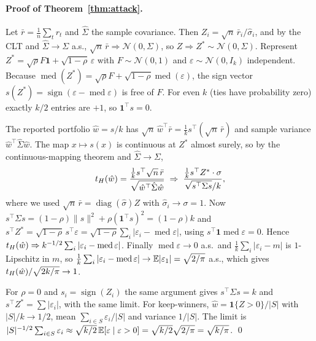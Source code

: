 \paragraph{Proof of Theorem~\ref{thm:attack}.}
Let $\bar r=\frac1n\sum_t r_t$ and $\hat\Sigma$ the sample covariance. Then $Z_i=\sqrt n\,\bar r_i/\hat\sigma_i$, and by the CLT and $\hat\Sigma\to\Sigma$ a.s., $\sqrt n\,\bar r\Rightarrow\mathcal N(0,\Sigma)$, so $Z\Rightarrow Z^\ast\sim\mathcal N(0,\Sigma)$. Represent $Z^\ast=\sqrt\rho F\mathbf 1+\sqrt{1-\rho}\,\varepsilon$ with $F\sim\mathcal N(0,1)$ and $\varepsilon\sim\mathcal N(0,I_k)$ independent. Because $\operatorname{med}(Z^\ast)=\sqrt\rho F+\sqrt{1-\rho}\operatorname{med}(\varepsilon)$, the sign vector $s(Z^\ast)=\operatorname{sign}(\varepsilon-\operatorname{med}\varepsilon)$ is free of $F$. For even $k$ (ties have probability zero) exactly $k/2$ entries are $+1$, so $\mathbf 1^\top s=0$.

The reported portfolio $\hat w=s/k$ has $\sqrt n\,\hat w^\top\bar r=\frac1k s^\top(\sqrt n\,\bar r)$ and sample variance $\hat w^\top\hat\Sigma\hat w$. The map $x\mapsto s(x)$ is continuous at $Z^\ast$ almost surely, so by the continuous-mapping theorem and $\hat\Sigma\to\Sigma$,
\[
t_{H}(\hat w)=\frac{\frac1k s^\top\sqrt n\,\bar r}{\sqrt{\hat w^\top\hat\Sigma\hat w}}\;\Rightarrow\;\frac{\frac1k s^\top Z^\ast\cdot\sigma}{\sqrt{s^\top\Sigma s}/k},
\]
where we used $\sqrt n\,\bar r=\operatorname{diag}(\hat\sigma)Z$ with $\hat\sigma_i\to\sigma=1$. Now $s^\top\Sigma s=(1-\rho)\|s\|^2+\rho(\mathbf 1^\top s)^2=(1-\rho)k$ and $s^\top Z^\ast=\sqrt{1-\rho}\,s^\top\varepsilon=\sqrt{1-\rho}\sum_i|\varepsilon_i-\operatorname{med}\varepsilon|$, using $s^\top\mathbf 1\operatorname{med}\varepsilon=0$. Hence $t_{H}(\hat w)\Rightarrow k^{-1/2}\sum_i|\varepsilon_i-\operatorname{med}\varepsilon|$. Finally $\operatorname{med}\varepsilon\to0$ a.s.\ and $\frac1k\sum_i|\varepsilon_i-m|$ is $1$-Lipschitz in $m$, so $\frac1k\sum_i|\varepsilon_i-\operatorname{med}\varepsilon|\to\mathbb{E}|\varepsilon_1|=\sqrt{2/\pi}$ a.s., which gives $t_{H}(\hat w)/\sqrt{2k/\pi}\to1$.

For $\rho=0$ and $s_i=\operatorname{sign}(Z_i)$ the same argument gives $s^\top\Sigma s=k$ and $s^\top Z^\ast=\sum|\varepsilon_i|$, with the same limit. For keep-winners, $\hat w=\mathbf{1}\{Z>0\}/|S|$ with $|S|/k\to1/2$, mean $\sum_{i\in S}\varepsilon_i/|S|$ and variance $1/|S|$. The limit is $|S|^{-1/2}\sum_{i\in S}\varepsilon_i\approx\sqrt{k/2}\,\mathbb{E}[\varepsilon\mid\varepsilon>0]=\sqrt{k/2}\sqrt{2/\pi}=\sqrt{k/\pi}$. \qed

